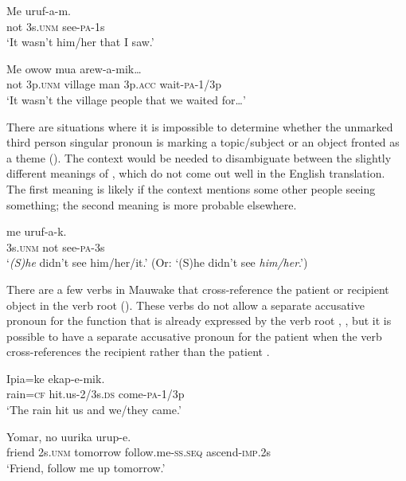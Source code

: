 \ea%
\label{ex:3:x561}
\gll Me  uruf-a-m. \\
not 3s.\textsc{unm} see-\textsc{pa}-1s\\
\glt`It wasn't him/her that I saw.'
\z

\ea%
\label{ex:3:x562}
\gll Me  owow mua  arew-a-mik{\dots} \\
not 3p.\textsc{unm} village man 3p.\textsc{acc} wait-\textsc{pa}-1/3p\\
\glt`It wasn't the village people that we waited for{\dots}'
\z

There are situations where it is impossible to determine whether the unmarked third person singular pronoun is marking a topic/subject or an object fronted as a theme (). The context would be needed to disambiguate between the slightly different meanings of , which do not come out well in the English translation. The first meaning is likely if the context mentions some other people seeing something; the second meaning is more probable elsewhere. 

\ea%
\label{ex:3:x563}
\gll {} me uruf-a-k. \\
3s.\textsc{unm} not see-\textsc{pa}-3s\\
\glt`\textit{(S)he} didn't see him/her/it.' (Or: `(S)he didn't see \textit{him/her}.')
\z

There are a few verbs in Mauwake that cross-reference the patient or recipient object in the verb root (). These verbs do not allow a separate accusative pronoun for the function that is already expressed by the verb root , , but it is possible to have a separate accusative pronoun for the patient when the verb cross-references the recipient rather than the patient .

\ea%
\label{ex:3:x564}
\gll Ipia=ke  ekap-e-mik. \\
rain=\textsc{cf} hit.us-2/3s.\textsc{ds} come-\textsc{pa}-1/3p\\
\glt`The rain hit us and we/they came.'
\z

\ea%
\label{ex:3:x1526}
\gll Yomar, no uurika \textstyleEmphasizedVernacularWords{-} urup-e. \\
friend 2s.\textsc{unm} tomorrow follow.me-\textsc{ss}.\textsc{seq} ascend-\textsc{imp}.2s\\
\glt`Friend, follow me up tomorrow.'
\z

